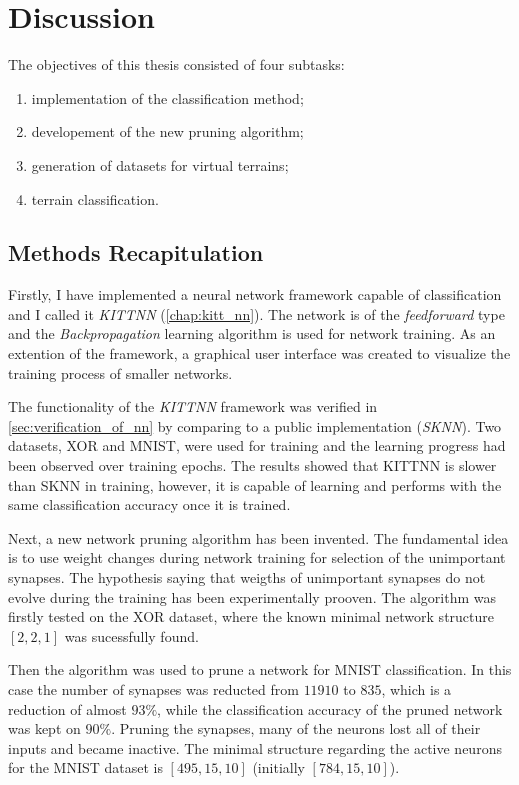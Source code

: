 \chapter{Discussion} \label{chap:discussion}
The objectives of this thesis consisted of four subtasks:

\begin{enumerate}
\item implementation of the classification method;
\item developement of the new pruning algorithm;
\item generation of datasets for virtual terrains;
\item terrain classification.
\end{enumerate}

\section{Methods Recapitulation} \label{sec:dis:methods_recap}
Firstly, I have implemented a neural network framework capable of classification and I called it \textit{KITTNN} (\cref{chap:kitt_nn}). The network is of the \textit{feedforward} type and the \textit{Backpropagation} learning algorithm is used for network training. As an extention of the framework, a graphical user interface was created to visualize the training process of smaller networks.

The functionality of the \textit{KITTNN} framework was verified in \cref{sec:verification_of_nn} by comparing to a public implementation (\textit{SKNN}). Two datasets, XOR and MNIST, were used for training and the learning progress had been observed over training epochs. The results showed that KITTNN is slower than SKNN in training, however, it is capable of learning and performs with the same classification accuracy once it is trained.

Next, a new network pruning algorithm has been invented. The fundamental idea is to use weight changes during network training for selection of the unimportant synapses. The hypothesis saying that weigths of unimportant synapses do not evolve during the training has been experimentally prooven. The algorithm was firstly tested on the XOR dataset, where the known minimal network structure $ [2, 2, 1] $ was sucessfully found.

Then the algorithm was used to prune a network for MNIST classification. In this case the number of synapses was reducted from $ 11910 $ to $ 835 $, which is a reduction of almost $ 93\% $, while the classification accuracy of the pruned network was kept on $ 90\% $. Pruning the synapses, many of the neurons lost all of their inputs and became inactive. The minimal structure regarding the active neurons for the MNIST dataset is $ [495, 15, 10] $ (initially $ [784, 15, 10] $). 



